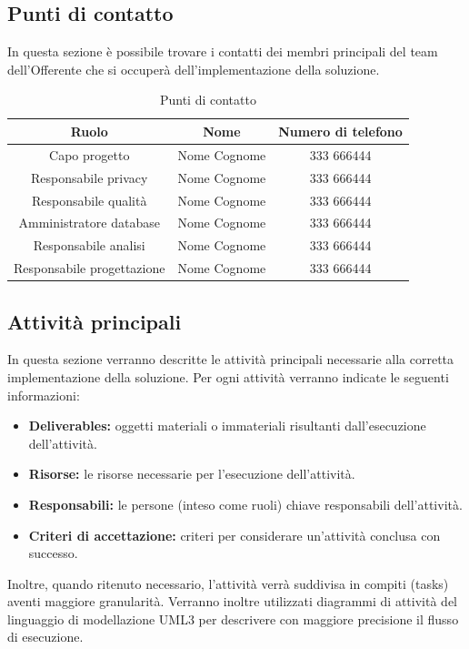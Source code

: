            
		\subsection{Punti di contatto}
        In questa sezione è possibile trovare i contatti dei membri principali del team dell'Offerente che si occuperà dell'implementazione della soluzione.
        \begin{table}[H]
            \begin{tabular}{ c c c }
            \toprule
            \textbf{Ruolo} & \textbf{Nome} &\textbf{Numero di telefono} \\
            \toprule
            Capo progetto & Nome Cognome & 333 666444 \\
            Responsabile privacy & Nome Cognome & 333 666444 \\
            Responsabile qualità & Nome Cognome & 333 666444 \\
            Amministratore database & Nome Cognome & 333 666444 \\
            Responsabile analisi & Nome Cognome & 333 666444 \\
            Responsabile progettazione & Nome Cognome & 333 666444 \\
            \bottomrule
            \end{tabular}
            \caption{Punti di contatto}
        \end{table}

		\subsection{Attività principali}
        \label{sec:attivita}
        	In questa sezione verranno descritte le attività principali necessarie alla corretta implementazione della soluzione. Per ogni attività verranno indicate le seguenti informazioni:
            \begin{itemize}
            	\item \textbf{Deliverables:} oggetti materiali o immateriali risultanti dall'esecuzione dell'attività.
                \item \textbf{Risorse:} le risorse necessarie per l'esecuzione dell'attività.
                \item \textbf{Responsabili:} le persone (inteso come ruoli) chiave responsabili dell'attività.
                \item \textbf{Criteri di accettazione:} criteri per considerare un'attività conclusa con successo.
            \end{itemize}
            Inoltre, quando ritenuto necessario, l'attività verrà suddivisa in compiti (tasks) aventi maggiore granularità. Verranno inoltre utilizzati diagrammi di attività del linguaggio di modellazione UML3 per descrivere con maggiore precisione il flusso di esecuzione.
            
